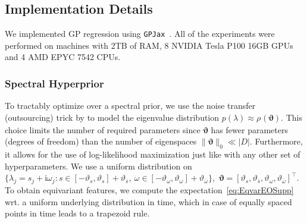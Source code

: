 \subsection{Implementation Details}
We implemented GP regression using \texttt{GPJax}~\citep{Pinder2022}. All of the experiments were performed on machines with {2TB} of RAM, 8 NVIDIA Tesla P100 16GB GPUs and 4 AMD EPYC 7542 CPUs.

\subsubsection{Spectral Hyperprior}\label{ssec:SpecPrio}
To tractably optimize over a spectral prior, we use the noise transfer (outsourcing) trick by \cite[Theorem 5.10]{kallenberg1997foundations} to model the eigenvalue distribution $p(\lambda) \approx \rho_{}(\bm{\vartheta})$.
This choice limits the number of required parameters since $\bm{\vartheta}$ has fewer parameters (degrees of freedom) than the number of eigenspaces $\|\bm{\vartheta}\|_0 \ll |D|$. Furthermore, it allows for the use of log-likelihood maximization just like with any other set of hyperparameters. We use a uniform distribution on $\{\lambda_j=s_j+\mathrm{i}\omega_j: s\in [-\vartheta_{s}, \vartheta_{s}]+\vartheta_{\overline{s}},~\omega\in[-\vartheta_{\omega}, \vartheta_{\omega}]+\vartheta_{\overline{\omega}}\}$,~$\bm{\vartheta}{=}[\vartheta_s,\vartheta_{\overline{s}},\vartheta_{\omega},\vartheta_{\overline{\omega}}]^\top$. To obtain equivariant features, we compute the expectation~\eqref{eq:EqvarEOSupp} wrt. a uniform underlying distribution in time, which in case of equally spaced points in time leads to a trapezoid rule.
